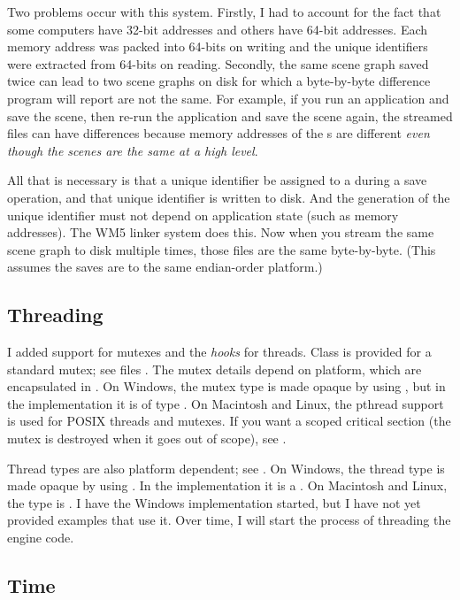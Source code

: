 \documentclass{article}
\begin{document}
Two problems occur with this system.  Firstly, I had to account for the fact that
some computers have 32-bit addresses and others have 64-bit addresses.  Each
memory address was packed into 64-bits on writing and the unique identifiers
were extracted from 64-bits on reading.  Secondly, the same scene graph saved twice
can lead to two scene graphs on disk for which a byte-by-byte difference program
will report are not the same.  For example, if you run an application and save
the scene, then re-run the application and save the scene again, the streamed
files can have differences because memory addresses of the s are
different {\em even though the scenes are the same at a high level}.

All that is necessary is that a unique identifier be assigned to a 
during a save operation, and that unique identifier is written to disk.  And
the generation of the unique identifier must not depend on application state
(such as memory addresses).  The WM5 linker system does this.  Now when you
stream the same scene graph to disk multiple times, those files are the same
byte-by-byte.  (This assumes the saves are to the same endian-order platform.)

\subsection{Threading}

I added support for mutexes and the {\em hooks} for threads.  Class 
is provided for a standard mutex; see files .  The mutex details
depend on platform, which are encapsulated in .  On Windows,
the mutex type is made opaque by using , but in the implementation it
is of type .  On Macintosh and Linux, the pthread support is used for
POSIX threads and mutexes.  If you want a scoped critical section (the mutex is
destroyed when it goes out of scope), see .

Thread types are also platform dependent; see .  On Windows,
the thread type is made opaque by using .  In the implementation it is
a .  On Macintosh and Linux, the type is .  I have
the Windows implementation started, but I have not yet provided examples that use
it.  Over time, I will start the process of threading the engine code.

\subsection{Time}
\end{document}
